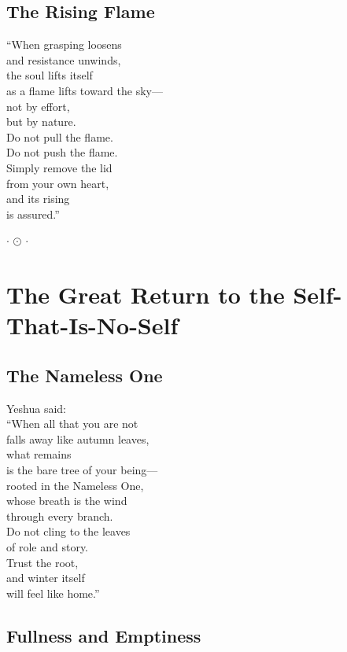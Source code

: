 \documentclass[10pt, openright]{book}
\newcommand{\sectionbreak}{\filbreak}
\newcommand{\ornament}{
    \vspace{1.5cm}
    \begin{center}
        \large \(\cdot\) \(\odot\) \(\cdot\)
    \end{center}
    \vspace{1.5cm}
}
\begin{document}
\section{The Rising Flame}\label{the-rising-flame}

``When grasping loosens\\
and resistance unwinds,\\
the soul lifts itself\\
as a flame lifts toward the sky---\\
not by effort,\\
but by nature.\\
Do not pull the flame.\\
Do not push the flame.\\
Simply remove the lid\\
from your own heart,\\
and its rising\\
is assured.''

\ornament

\chapter{The Great Return to the
Self-That-Is-No-Self}\label{the-great-return-to-the-self-that-is-no-self}

\sectionbreak

\section{The Nameless One}\label{the-nameless-one}

Yeshua said:\\
``When all that you are not\\
falls away like autumn leaves,\\
what remains\\
is the bare tree of your being---\\
rooted in the Nameless One,\\
whose breath is the wind\\
through every branch.\\
Do not cling to the leaves\\
of role and story.\\
Trust the root,\\
and winter itself\\
will feel like home.''

\sectionbreak

\section{Fullness and Emptiness}\label{fullness-and-emptiness}
\end{document}
